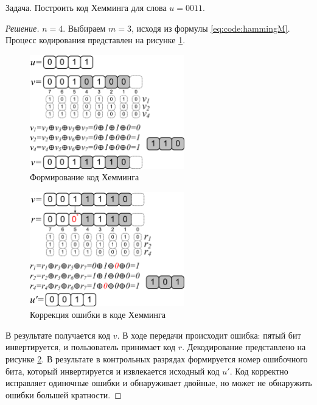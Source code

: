 \begin{exampl}
    Задача. Построить код Хемминга для слова $u=0011$.
\end{exampl}
\begin{proof}[Решение]
    $n=4$. Выбираем $m=3$, исходя из формулы \eqref{eq:code:hammingM}. Процесс кодирования представлен на рисунке \ref{fig:code:hammingEncode}. 
    \begin{figure}
        \centering
        \includegraphics[width=0.6\textwidth]{fig/hammingEncode}
        \caption{Формирование код Хемминга}
        \label{fig:code:hammingEncode}
    \end{figure}
    \begin{figure}
        \centering
        \includegraphics[width=0.6\textwidth]{fig/hammingDecode}
        \caption{Коррекция ошибки в коде Хемминга}
        \label{fig:code:hammingDecode}
    \end{figure}
    
    В результате получается код $v$. В ходе передачи происходит ошибка: пятый бит инвертируется, и пользователь принимает код $r$. Декодирование представлено на рисунке \ref{fig:code:hammingDecode}. В результате в контрольных разрядах формируется номер ошибочного бита, который инвертируется и извлекается исходный код $u'$. Код корректно исправляет одиночные ошибки и обнаруживает двойные, но может не обнаружить ошибки большей кратности.
\end{proof}


